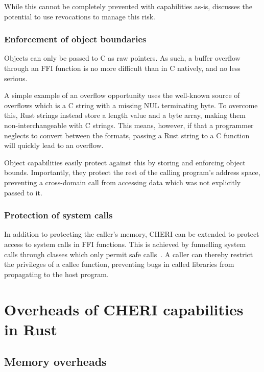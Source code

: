 \documentclass[dissertation.tex]{subfiles}
\begin{document}
While this cannot be completely prevented with capabilities as-is,
 discusses the potential to use revocations
to manage this risk.

\subsubsection{Enforcement of object boundaries}

Objects can only be passed to C as raw pointers.
As such, a buffer overflow through an FFI function is no more difficult
than in C natively, and no less serious.

A simple example of an overflow opportunity uses the well-known source
of overflows which is a C string with a missing NUL terminating byte.
To overcome this, Rust strings instead store a length value and a byte
array, making them non-interchangeable with C strings.
This means, however, if that a programmer neglects to convert between
the formats, passing a Rust string to a C function will quickly lead to
an overflow.

Object capabilities easily protect against this by storing and enforcing
object bounds.
Importantly, they protect the rest of the calling program's address
space, preventing a cross-domain call from accessing data which was not
explicitly passed to it.

\subsubsection{Protection of system calls}
In addition to protecting the caller's memory, CHERI can be extended to
protect access to system calls in FFI functions.
This is achieved by funnelling system calls through classes which only
permit safe calls~\cite{cheri2015}.
A caller can thereby restrict the privileges of a callee function,
preventing bugs in called libraries from propagating to the host
program.


\section{Overheads of CHERI capabilities in Rust}

\subsection{Memory overheads}
\end{document}
